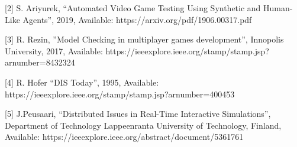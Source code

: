 \documentclass[conference]{IEEEtran}
\begin{document}
[2] S. Ariyurek, “Automated Video Game Testing Using
Synthetic and Human-Like Agents”, 2019, Available: https://arxiv.org/pdf/1906.00317.pdf
	
[3] R. Rezin, ”Model Checking in multiplayer games development”, Innopolis University, 
2017, Available: https://ieeexplore.ieee.org/stamp/stamp.jsp?arnumber=8432324

[4] R. Hofer “DIS Today”, 1995, Available:
https://ieeexplore.ieee.org/stamp/stamp.jsp?arnumber=400453

[5] J.Peusaari, “Distributed Issues in Real-Time Interactive Simulations”, Department of Technology Lappeenranta University of Technology, Finland,
 Available: https://ieeexplore.ieee.org/abstract/document/5361761
\end{document}
